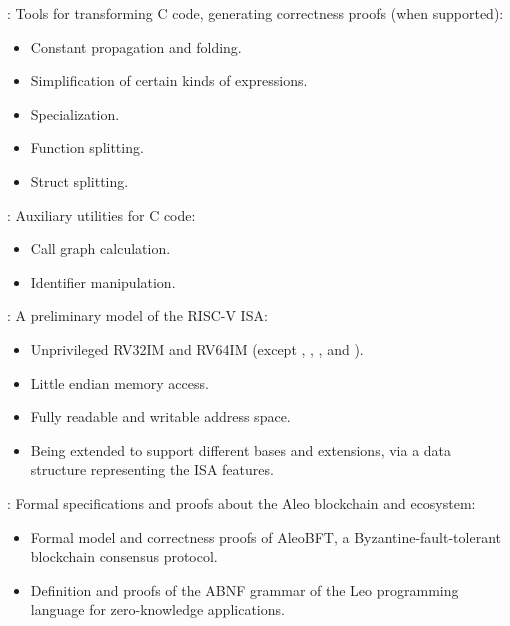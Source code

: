 \begin{frame}

\newlibtitle

:
Tools for transforming C code,
generating correctness proofs (when supported):
\begin{itemize}
\item Constant propagation and folding.
\item Simplification of certain kinds of expressions.
\item Specialization.
\item Function splitting.
\item Struct splitting.
\end{itemize}

\separation

:
Auxiliary utilities for C code:
\begin{itemize}
\item Call graph calculation.
\item Identifier manipulation.
\end{itemize}

\end{frame}


\begin{frame}

\newlibtitle

:
A preliminary model of the RISC-V ISA:
\begin{itemize}
\item Unprivileged RV32IM and RV64IM
      (except , , , and ).
\item Little endian memory access.
\item Fully readable and writable address space.
\item Being extended to support different bases and extensions,
      via a data structure representing the ISA features.
\end{itemize}

\end{frame}


\begin{frame}

\newlibtitle

:
Formal specifications and proofs about the Aleo blockchain and ecosystem:
\begin{itemize}
\item Formal model and correctness proofs of AleoBFT,
      a Byzantine-fault-tolerant blockchain consensus protocol.
\item Definition and proofs of the ABNF grammar of
      the Leo programming language for zero-knowledge applications.
\end{itemize}

\end{frame}

